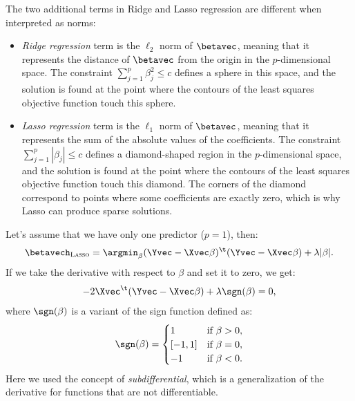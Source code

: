 The two additional terms in Ridge and Lasso regression are different when interpreted as norms:
\begin{itemize}
    \item \emph{Ridge regression} term is the $\ell_2$ norm of $\betavec$, meaning that it represents the distance of $\betavec$ from the origin in the $p$-dimensional space. The constraint $\sum_{j=1}^p \beta_j^2 \leq c$ defines a sphere in this space, and the solution is found at the point where the contours of the least squares objective function touch this sphere.
    \item \emph{Lasso regression} term is the $\ell_1$ norm of $\betavec$, meaning that it represents the sum of the absolute values of the coefficients. The constraint $\sum_{j=1}^p |\beta_j| \leq c$ defines a diamond-shaped region in the $p$-dimensional space, and the solution is found at the point where the contours of the least squares objective function touch this diamond. The corners of the diamond correspond to points where some coefficients are exactly zero, which is why Lasso can produce sparse solutions.
\end{itemize}

\begin{example}
    Let's assume that we have only one predictor ($p = 1$), then:
    \begin{equation}
        \betavech_{\textsc{Lasso}} = \argmin_{\beta} {(\Yvec - \Xvec\beta)^\t (\Yvec - \Xvec\beta) + \lambda |\beta|}.
    \end{equation}
    If we take the derivative with respect to $\beta$ and set it to zero, we get:
    \begin{equation}
        -2 \Xvec^\t(\Yvec - \Xvec\beta) + \lambda\sgn(\beta) = 0,
    \end{equation}
    where $\sgn(\beta)$ is a variant of the sign function defined as:
    \begin{equation}
        \sgn(\beta) = \begin{cases}
            1      & \text{if } \beta > 0, \\
            [-1,1] & \text{if } \beta = 0, \\
            -1     & \text{if } \beta < 0.
        \end{cases}
    \end{equation}
    Here we used the concept of \emph{subdifferential}, which is a generalization of the derivative for functions that are not differentiable.
\end{example}

